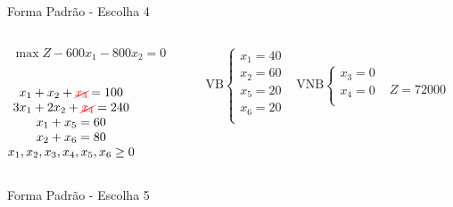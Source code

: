 \documentclass{beamer}
\begin{document}
\begin{frame}
{\begin{block}{Forma Padrão - {\color{cyan}Escolha 4}}
			\begin{columns}
				\begin{column}{0.35\textwidth}
					$
						\begin{matrix}
							\max Z - 600x_1 - 800x_2 = 0 \\
						\end{matrix}
					$ \\
					 \\
					$
						\begin{matrix}
							x_1  + x_2  + {\color{red}\cancel{x_3}}                   = 100 \\
							3x_1 + 2x_2       + {\color{red}\cancel{x_4}}             = 240 \\
							x_1                     + x_5       = 60 \\
							x_2                           + x_6 = 80 \\
							x_1,x_2, x_3, x_4, x_5, x_6 \ge 0 \\
						\end{matrix}
					$
				\end{column}
				\vline
				\hspace{0.1cm}
				\begin{column}{0.45\textwidth}
						$
							\begin{matrix}
								\text{VB} \left\{  \begin{matrix}
																 x_1 = 40 \\
																 x_2 = 60 \\
																 x_5 = 20 \\
																 x_6 = 20 \\
												   \end{matrix} 
										   \right.
								&
								\text{VNB} \left\{  \begin{matrix}
																 x_3 = 0 \\
																 x_4 = 0 \\
												   \end{matrix} 
										   \right. 
								\\
							 & \\
							\end{matrix}
						$
						{\color{red}$ Z = 72000 $}
				\end{column}
			\end{columns}
		\end{block}
	}
	{
		\begin{block}{Forma Padrão - {\color{cyan}Escolha 5}}

\end{block}}
\end{frame}
\end{document}
